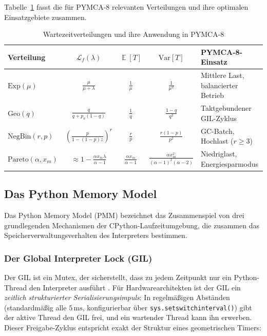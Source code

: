 ﻿\documentclass[a4paper,12pt]{scrreprt}
\theoremstyle{definition}
\DeclareMathOperator{\E}{\mathbb{E}}
\newcommand{\Exp}{\mathrm{Exp}}
\newcommand{\Geo}{\mathrm{Geo}}
\newcommand{\NBin}{\mathrm{NegBin}}
\newcommand{\Pareto}{\mathrm{Pareto}}
\begin{document}
	Tabelle~\ref{tab:distributions} fasst die für PYMCA-8 relevanten
	Verteilungen und ihre optimalen Einsatzgebiete zusammen.
	
	\begin{table}[H]
		\centering
		\caption{Wartezeitverteilungen und ihre Anwendung in PYMCA-8}
		\label{tab:distributions}
		\renewcommand{\arraystretch}{1.4}
		\begin{tabular}{lcccp{4cm}}
			\toprule
			\textbf{Verteilung} & $\mathcal{L}_f(\lambda)$ & $\E[T]$
			& $\mathrm{Var}[T]$ & \textbf{PYMCA-8-Einsatz} \\
			\midrule
			$\Exp(\mu)$
			& $\frac{\mu}{\mu+\lambda}$
			& $\frac{1}{\mu}$
			& $\frac{1}{\mu^2}$
			& Mittlere Last, balancierter Betrieb \\[4pt]
			$\Geo(q)$
			& $\frac{q}{q+p_a(1-q)}$
			& $\frac{1}{q}$
			& $\frac{1-q}{q^2}$
			& Taktgebundener GIL-Zyklus \\[4pt]
			$\NBin(r,p)$
			& $\left(\frac{p}{1-(1-p)z}\right)^r$
			& $\frac{r}{p}$
			& $\frac{r(1-p)}{p^2}$
			& GC-Batch, Hochlast ($r \geq 3$) \\[4pt]
			$\Pareto(\alpha, x_m)$
			& $\approx 1 - \frac{\alpha x_m\lambda}{\alpha-1}$
			& $\frac{\alpha x_m}{\alpha-1}$
			& $\frac{\alpha x_m^2}{(\alpha-1)^2(\alpha-2)}$
			& Niedriglast, Energiesparmodus \\[4pt]
			\bottomrule
		\end{tabular}
	\end{table}
	
	\subsection{Das Python Memory Model}
	
	Das Python Memory Model (PMM) bezeichnet das Zusammenspiel von drei
	grundlegenden Mechanismen der CPython-Laufzeitumgebung, die zusammen
	das Speicherverwaltungsverhalten des Interpreters bestimmen.
	
	\subsubsection{Der Global Interpreter Lock (GIL)}
	
	Der GIL ist ein Mutex, der sicherstellt, dass zu jedem Zeitpunkt nur ein
	Python-Thread den Interpreter ausführt \cite{python_gil}. Für Hardwarearchitekten
	ist der GIL ein \emph{zeitlich strukturierter Serialisierungsimpuls}: In
	regelmäßigen Abständen (standardmäßig alle $5\,\mathrm{ms}$, konfigurierbar
	über \texttt{sys.setswitchinterval()}) gibt der aktive Thread den GIL frei,
	und ein wartender Thread kann ihn erwerben. Dieser Freigabe-Zyklus entspricht
	exakt der Struktur eines geometrischen Timers:
	
\end{document}
